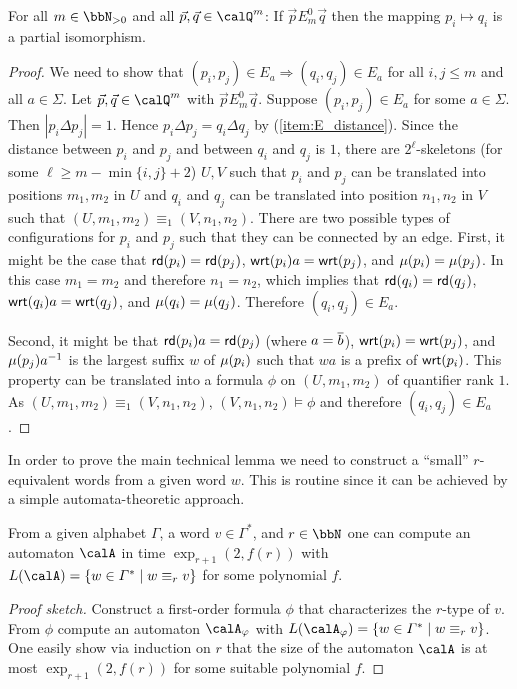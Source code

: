 \begin{lemma}\label{lem:partial_isomorphism}
	For all $m\in\bbN_{>0}$ and all $\vec{p},\vec{q} \in \Qx^m$: If $\vec{p} E^0_m \vec{q}$ then the mapping $p_i \mapsto q_i$ is a partial isomorphism.
\end{lemma}
\begin{proof}
	We need to show that $(p_i,p_j)\in E_a \Rightarrow (q_i,q_j)\in E_a$  for all $i,j\leq m$ and all $a\in \Sigma$.
	Let $\vec{p}, \vec{q} \in \Qx^m$ with $\vec{p} E^0_m \vec{q}$. Suppose  $(p_i,p_j) \in E_a$ for some $a\in\Sigma$. Then $|p_i\Delta p_j| = 1$. Hence $p_i\Delta p_j = q_i\Delta q_j$ by (\ref{item:E_distance}). 
	Since the distance between $p_i$ and $p_j$ and between $q_i$ and $q_j$ is $1$, there are $2^\ell$-skeletons (for some $\ell \geq m-\min\{i,j\}+2$) $U,V$ such that 
	$p_i$ and $p_j$ can be translated into positions $m_1, m_2$ in $U$ and $q_i$ and $q_j$ can be translated into position $n_1,n_2$ in $V$ such that $(U,m_1,m_2) \equiv_1 (V,n_1,n_2)$. 
	There are two possible types of configurations for $p_i$ and $p_j$ such that they can be connected by an edge. First, it might be the case  that $\mathsf{rd}(p_i) = \mathsf{rd}(p_j)$,
	$\mathsf{wrt}(p_i)a = \mathsf{wrt}(p_j)$, and $\mu(p_i) = \mu(p_j)$. In this case $m_1=m_2$ and therefore $n_1=n_2$, which implies that $\mathsf{rd}(q_i) = \mathsf{rd}(q_j)$,
	$\mathsf{wrt}(q_i)a = \mathsf{wrt}(q_j)$, and $\mu(q_i) = \mu(q_j)$. Therefore $(q_i,q_j) \in E_a$.
	
	Second, it might be that $\mathsf{rd}(p_i)a = \mathsf{rd}(p_j)$ (where $a=\overline{b}$),
	$\mathsf{wrt}(p_i) = \mathsf{wrt}(p_j)$, and $\mu(p_j)a^{-1}$ is the largest suffix $w$ of $\mu(p_i)$ such that $wa$ is a prefix of $\mathsf{wrt}(p_i)$.  This property can be translated into a formula $\phi$ 
	on $(U, m_1, m_2)$ of quantifier rank $1$. As $(U,m_1,m_2) \equiv_1 (V, n_1,n_2)$, $(V,n_1,n_2) \models \phi$ and therefore $(q_i,q_j)\in E_a$.
\end{proof}

In order to prove the main technical lemma we need to construct a ``small'' $r$-equivalent words from a given word $w$. This is routine since it can be achieved by a simple automata-theoretic approach.
\begin{lemma}\label{lem:r-equiv_word_construction}
	From a given alphabet $\Gamma$, a word $v\in\Gamma^\ast$, and $r\in\bbN$ one can compute an automaton $\calA$ in time $\exp_{r+1}(2, f(r))$ with $L(\calA) = \{w\in \Gamma^\ast\mid w\equiv_r v \}$ for some polynomial $f$.
\end{lemma}
\begin{proof}[Proof sketch]
	Construct a first-order formula $\phi$ that characterizes the $r$-type of $v$. From $\phi$ compute an automaton $\calA_\phi$ with $L(\calA_\phi) = \{ w\in\Gamma^\ast \mid w\equiv_r v \}$. One easily show via induction on $r$ that the size of the automaton $\calA$ is at most
	$\exp_{r+1}(2, f(r))$ for some suitable polynomial $f$.
\end{proof}


